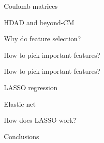 \begin{frame}[t]{Coulomb matrices}

\end{frame}
\begin{frame}[t]{HDAD and beyond-CM}

\end{frame}
%
%
\begin{frame}[t]{Why do feature selection?}

\end{frame}
\begin{frame}[t]{How to pick important features?}

\end{frame}
\begin{frame}[t]{How to pick important features?}

\end{frame}
\begin{frame}[t]{LASSO regression}

\end{frame}
\begin{frame}[t]{Elastic net}

\end{frame}
\begin{frame}[t]{How does LASSO work?}

\end{frame}

\begin{frame}[t]{Conclusions}

\end{frame}
